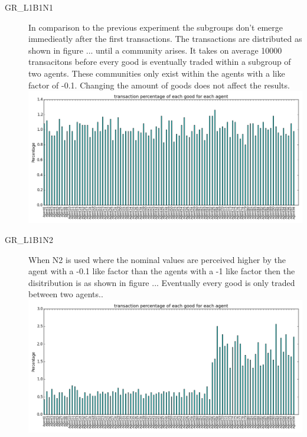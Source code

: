 \documentclass[twoside,openright]{uva-bachelor-thesis}
\begin{document}
\begin{description}
\item[GR\_L1B1N1] In comparison to the previous experiment the subgroups don't emerge immedieatly after the first transactions. The transactions are distributed as shown in figure ... until a community arises. It takes on average 10000 transacitons before every good is eventually traded within a subgroup of two agents. These communities only exist within the agents with a like factor of -0.1. Changing the amount of goods does not affect the results. \\
\includegraphics[scale=0.4]{GR_L1B2N1/5k_1good_b1n1}

\item[GR\_L1B1N2] When N2 is used where the nominal values are perceived higher by the agent with a -0.1 like factor than the agents with a -1 like factor then the disitribution is as shown in figure ... Eventually every good is only traded between two agents.. \\
\includegraphics[scale=0.4]{GR_L1B2N2/3k_1good_b1n2} 


\end{description}
\end{document}
